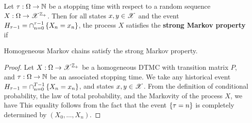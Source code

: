 \documentclass[letterpaper,10pt,english]{article}
\begin{document}
\begin{defn}
Let $\tau:\Omega\to\mathbb{N}$ be a stopping time with respect to a random sequence $X:\Omega\to\mathscr{X}^{\mathbb{Z}_+}$. %
Then for all states $x,y \in \mathscr{X}$ and the event $H_{\tau-1} = \cap_{n=0}^{\tau-1}\left\{X_n = x_n\right\}$, the process $X$ satisfies the \textbf{strong Markov property} if 
\end{defn}
\begin{lem}
Homogeneous Markov chains satisfy the strong Markov property. 
\end{lem}
\begin{proof}
Let $X:\Omega \to \mathscr{X}^{\mathbb{Z}_+}$ be a homogeneous DTMC with transition matrix $P$, 
and $\tau:\Omega\to\mathbb{N}$ be an associated stopping time. 
We take any historical event $H_{\tau-1} = \cap_{n = 0}^{T-1}\left\{X_n = x_n\right\}$, and states $x, y \in \mathscr{X}$. 
From the definition of conditional probability, the law of total probability, and the Markovity of the process $X$, we have 
This equality follows from the fact that the event $\left\{\tau= n\right\}$ is completely determined by $(X_0, \dots, X_n)$. 
\end{proof}
\end{document}
